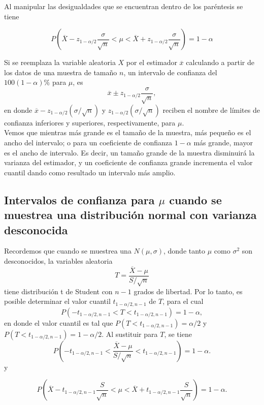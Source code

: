 Al manipular las desigualdades que se encuentran dentro de los paréntesis se tiene

\begin{tcolorbox}
$$P\left(\overline{X}-z_{1-\alpha/2}\dfrac{\sigma}{\sqrt{n}}<\mu<\overline{X}+z_{1-\alpha/2}\dfrac{\sigma}{\sqrt{n}}\right)=1-\alpha$$
\end{tcolorbox}

Si se reemplaza la variable aleatoria $X$ por el estimador $\overline{x}$ calculando a partir de los datos de una muestra de tamaño $n$, un intervalo de confianza del $100(1-\alpha)\%$ para $\mu$, es
$$\overline{x}\pm z_{1-\alpha/2}\dfrac{\sigma}{\sqrt{n}},$$
en donde $\overline{x}-z_{1-\alpha/2}(\sigma/\sqrt{n})$ y $z_{1-\alpha/2}(\sigma/\sqrt{n})$ reciben el nombre de límites de confianza inferiores y superiores, respectivamente, para $\mu$.\\

Vemos que mientras más grande es el tamaño de la muestra, más pequeño es el ancho del intervalo; o para un coeficiente de confianza $1-\alpha$ más grande, mayor es el ancho de intervalo. Es decir, un tamaño grande de la muestra disminuirá la varianza del estimador, y un coeficiente de confianza grande incrementa el valor cuantil dando como resultado un intervalo más amplio.


\subsection{Intervalos de confianza para \boldmath$\mu$ cuando se muestrea una distribución normal con varianza desconocida}

Recordemos que cuando se muestrea una $N(\mu,\sigma)$, donde tanto $\mu$ como $\sigma^2$ son desconocidos, la variables aleatoria
$$T=\dfrac{\overline{X}-\mu}{S/\sqrt{n}}$$
tiene distribución t de Student con $n-1$ grados de libertad. Por lo tanto, es posible determinar el valor cuantil $t_{1-\alpha/2,n-1}$ de $T$, para el cual
$$P(-t_{1-\alpha/2,n-1}<T<t_{1-\alpha/2,n-1})=1-\alpha,$$
en donde el valor cuantil es tal que $P(T<t_{1-\alpha/2,n-1})=\alpha/2$ y $P(T<t_{1-\alpha/2,n-1})=1-\alpha/2$. Al sustituir para $T$, se tiene
$$P\left(-t_{1-\alpha/2,n-1}<\dfrac{\overline{X}-\mu}{S/\sqrt{n}}<t_{1-\alpha/2,n-1}\right)=1-\alpha.$$
y
\begin{tcolorbox}
$$P\left(\overline{X}-t_{1-\alpha/2,n-1}\dfrac{S}{\sqrt{n}}<\mu<\overline{X}+t_{1-\alpha/2,n-1}\dfrac{S}{\sqrt{n}}\right)=1-\alpha.$$
\end{tcolorbox}


